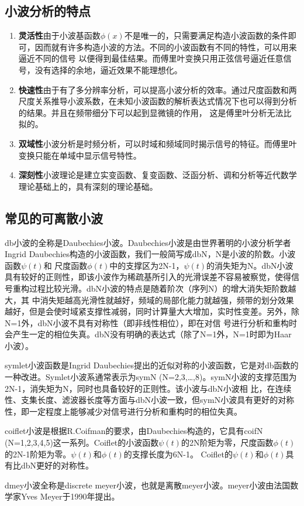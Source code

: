 \subsection{小波分析的特点}
\begin{enumerate}[1)]
	\item \textbf{灵活性}\quad 由于小波基函数$\phi(x)$不是唯一的，只需要满足构造小波函数的条件即可，因而就有许多构造小波的方法。不同的小波函数有不同的特性，可以用来逼近不同的信号
以便得到最佳结果。而傅里叶变换只用正弦信号逼近任意信号，没有选择的余地，逼近效果不能理想化。
	\item \textbf{快速性}\quad 由于有了多分辨率分析，可以提高小波分析的效率。通过尺度函数和两尺度关系推导小波系数，在未知小波函数的解析表达式情况下也可以得到分析的结果。并且在频带细分下可以起到显微镜的作用，
这是傅里叶分析无法比拟的。
	\item \textbf{双域性}\quad 小波分析是时频分析，可以时域和频域同时揭示信号的特征。而傅里叶变换只能在单域中显示信号特性。
	\item \textbf{深刻性}\quad 小波理论是建立实变函数、复变函数、泛函分析、调和分析等近代数学理论基础上的，具有深刻的理论基础。
\end{enumerate}
\subsection{常见的可离散小波}
\par  db小波的全称是Daubechies小波。Daubechies小波是由世界著明的小波分析学者Ingrid Daubechies构造的小波函数，我们一般简写成dbN，N是小波的阶数。小波函数$\psi(t)$和
尺度函数$\phi(t)$中的支撑区为2N-1，$\psi(t)$的消失矩为N。dbN小波具有较好的正则性，即该小波作为稀疏基所引入的光滑误差不容易被察觉，使得信号重构过程比较光滑。dbN小波的特点是随着阶次（序列N）的增大消失矩阶数越大，其
中消失矩越高光滑性就越好，频域的局部化能力就越强，频带的划分效果越好，但是会使时域紧支撑性减弱，同时计算量大大增加，实时性变差。另外，除N=1外，dbN小波不具有对称性（即非线性相位），即在对信
号进行分析和重构时会产生一定的相位失真。dbN没有明确的表达式（除了N=1外，N=1时即为Haar小波）。
\par  symlet小波函数是Ingrid Daubechies提出的近似对称的小波函数，它是对db函数的一种改进。Symlet小波系通常表示为symN (N=2,3,…,8)。symN小波的支撑范围为2N-1，消失矩为N，同时也具备较好的正则性。该小波与dbN小波相
比，在连续性、支集长度、滤波器长度等方面与dbN小波一致，但symN小波具有更好的对称性，即一定程度上能够减少对信号进行分析和重构时的相位失真。
\par  coiflet小波是根据R.Coifman的要求，由Daubechies构造的，它具有coifN (N=1,2,3,4,5)这一系列。Coiflet的小波函数$\psi(t)$的2N阶矩为零，尺度函数$\phi(t)$的2N-1阶矩为零。$\psi(t)$和$\phi(t)$的支撑长度为6N-1。
Coiflet的$\psi(t)$和$\phi(t)$具有比dbN更好的对称性。
\par  dmey小波全称是discrete meyer小波，也就是离散meyer小波。meyer小波由法国数学家Yves Meyer于1990年提出。
